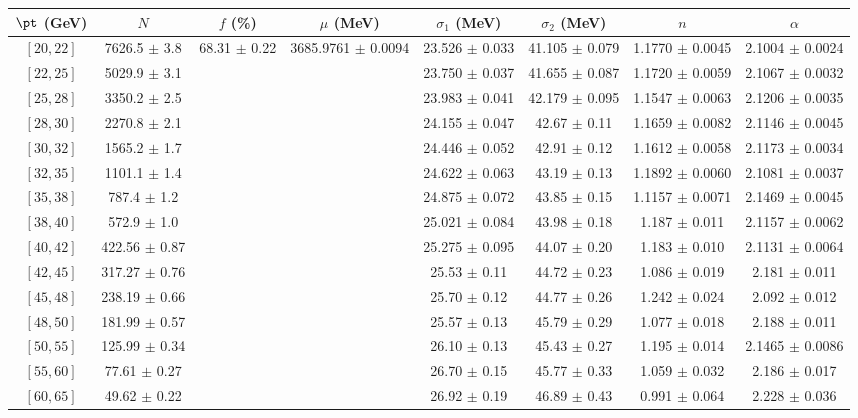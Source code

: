 \begin{tabular}{c||c|c|c|c|c|c|c}
$\pt$ (GeV) & $N$ & $f$ (\%) & $\mu$ (MeV) & $\sigma_1$ (MeV) & $\sigma_2$ (MeV) & $n$ & $\alpha$ \\
\hline
$[20, 22]$ & 7626.5 $\pm$ 3.8 & \multirow{20}{*}{68.31 $\pm$ 0.22} & \multirow{20}{*}{3685.9761 $\pm$ 0.0094} & 23.526 $\pm$ 0.033 & 41.105 $\pm$ 0.079 & 1.1770 $\pm$ 0.0045 & 2.1004 $\pm$ 0.0024\\
$[22, 25]$ & 5029.9 $\pm$ 3.1 &  &  & 23.750 $\pm$ 0.037 & 41.655 $\pm$ 0.087 & 1.1720 $\pm$ 0.0059 & 2.1067 $\pm$ 0.0032\\
$[25, 28]$ & 3350.2 $\pm$ 2.5 &  &  & 23.983 $\pm$ 0.041 & 42.179 $\pm$ 0.095 & 1.1547 $\pm$ 0.0063 & 2.1206 $\pm$ 0.0035\\
$[28, 30]$ & 2270.8 $\pm$ 2.1 &  &  & 24.155 $\pm$ 0.047 & 42.67 $\pm$ 0.11 & 1.1659 $\pm$ 0.0082 & 2.1146 $\pm$ 0.0045\\
$[30, 32]$ & 1565.2 $\pm$ 1.7 &  &  & 24.446 $\pm$ 0.052 & 42.91 $\pm$ 0.12 & 1.1612 $\pm$ 0.0058 & 2.1173 $\pm$ 0.0034\\
$[32, 35]$ & 1101.1 $\pm$ 1.4 &  &  & 24.622 $\pm$ 0.063 & 43.19 $\pm$ 0.13 & 1.1892 $\pm$ 0.0060 & 2.1081 $\pm$ 0.0037\\
$[35, 38]$ & 787.4 $\pm$ 1.2 &  &  & 24.875 $\pm$ 0.072 & 43.85 $\pm$ 0.15 & 1.1157 $\pm$ 0.0071 & 2.1469 $\pm$ 0.0045\\
$[38, 40]$ & 572.9 $\pm$ 1.0 &  &  & 25.021 $\pm$ 0.084 & 43.98 $\pm$ 0.18 & 1.187 $\pm$ 0.011 & 2.1157 $\pm$ 0.0062\\
$[40, 42]$ & 422.56 $\pm$ 0.87 &  &  & 25.275 $\pm$ 0.095 & 44.07 $\pm$ 0.20 & 1.183 $\pm$ 0.010 & 2.1131 $\pm$ 0.0064\\
$[42, 45]$ & 317.27 $\pm$ 0.76 &  &  & 25.53 $\pm$ 0.11 & 44.72 $\pm$ 0.23 & 1.086 $\pm$ 0.019 & 2.181 $\pm$ 0.011\\
$[45, 48]$ & 238.19 $\pm$ 0.66 &  &  & 25.70 $\pm$ 0.12 & 44.77 $\pm$ 0.26 & 1.242 $\pm$ 0.024 & 2.092 $\pm$ 0.012\\
$[48, 50]$ & 181.99 $\pm$ 0.57 &  &  & 25.57 $\pm$ 0.13 & 45.79 $\pm$ 0.29 & 1.077 $\pm$ 0.018 & 2.188 $\pm$ 0.011\\
$[50, 55]$ & 125.99 $\pm$ 0.34 &  &  & 26.10 $\pm$ 0.13 & 45.43 $\pm$ 0.27 & 1.195 $\pm$ 0.014 & 2.1465 $\pm$ 0.0086\\
$[55, 60]$ & 77.61 $\pm$ 0.27 &  &  & 26.70 $\pm$ 0.15 & 45.77 $\pm$ 0.33 & 1.059 $\pm$ 0.032 & 2.186 $\pm$ 0.017\\
$[60, 65]$ & 49.62 $\pm$ 0.22 &  &  & 26.92 $\pm$ 0.19 & 46.89 $\pm$ 0.43 & 0.991 $\pm$ 0.064 & 2.228 $\pm$ 0.036\\

\end{tabular}
